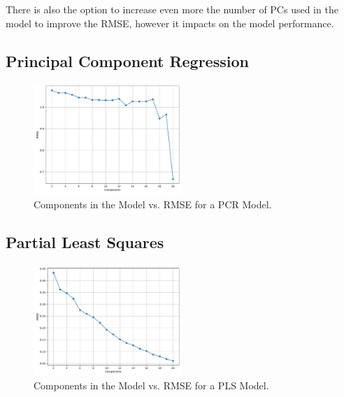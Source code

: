 There is also the option to increase even more the number of PCs used in the model to improve the RMSE, however it impacts on the model performance.

\subsection{Principal Component Regression}

\begin{figure}[htbp!]
  \centerline{\includegraphics[width=0.5\textwidth]{../../code/hw2/figures/5-PCR-RMSE.pdf}}
  \caption{Components in the Model vs. RMSE for a PCR Model.}
  \label{fig:5-PCR-RMSE}
\end{figure}

\subsection{Partial Least Squares}

\begin{figure}[htbp!]
  \centerline{\includegraphics[width=0.5\textwidth]{../../code/hw2/figures/5-PLS-RMSE.pdf}}
  \caption{Components in the Model vs. RMSE for a PLS Model.}
  \label{fig:5-PLS-RMSE}
\end{figure}




